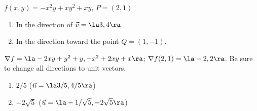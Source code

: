 {$f(x,y) = -x^2y+xy^2+xy$, $P= (2,1)$ \label{12_05_ex_11}
\begin{enumerate}
	\item In the direction of $\vec v = \la 3,4\ra$
	\item In the direction toward the point $Q = (1,-1)$.
\end{enumerate}
}
{$\nabla f = \la -2xy+y^2+y, -x^2+2xy+x\ra$; $\nabla f(2,1) = \la -2,2\ra$.
Be sure to change all directions to unit vectors.
\begin{enumerate}
	\item $2/5$ ($\vec u = \la 3/5,4/5\ra$)
	\item	$-2\sqrt{5}$ ($\vec u = \la -1/\sqrt{5},-2\sqrt{5}\ra$)
\end{enumerate}
}